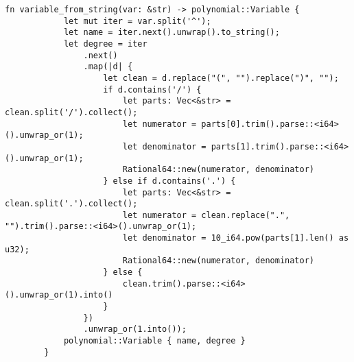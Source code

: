     \begin{lstlisting}[caption={The implementation of the \texttt{variable\_from\_string()} function}, label={lst:variable-from-string}]
        fn variable_from_string(var: &str) -> polynomial::Variable {
            let mut iter = var.split('^');
            let name = iter.next().unwrap().to_string();
            let degree = iter
                .next()
                .map(|d| {
                    let clean = d.replace("(", "").replace(")", "");
                    if d.contains('/') {
                        let parts: Vec<&str> = clean.split('/').collect();
                        let numerator = parts[0].trim().parse::<i64>().unwrap_or(1);
                        let denominator = parts[1].trim().parse::<i64>().unwrap_or(1);
                        Rational64::new(numerator, denominator)
                    } else if d.contains('.') {
                        let parts: Vec<&str> = clean.split('.').collect();
                        let numerator = clean.replace(".", "").trim().parse::<i64>().unwrap_or(1);
                        let denominator = 10_i64.pow(parts[1].len() as u32);
                        Rational64::new(numerator, denominator)
                    } else {
                        clean.trim().parse::<i64>().unwrap_or(1).into()
                    }
                })
                .unwrap_or(1.into());
            polynomial::Variable { name, degree }
        }
    \end{lstlisting}
    
